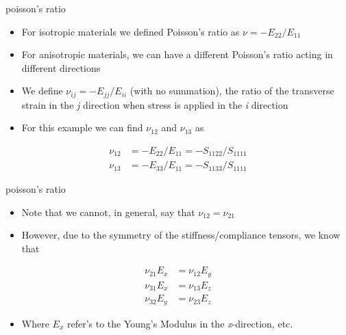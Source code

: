 \documentclass[
  letterpaper,
  ignorenonframetext,
  aspectratio=43,
  handout,
  12pt]{beamer}
\providecommand{\tightlist}{%
  \setlength{\itemsep}{0pt}\setlength{\parskip}{0pt}}
\providecommand{\tightlist}{%
\setlength{\itemsep}{0pt}\setlength{\parskip}{0pt}}
\begin{document}
\begin{frame}{poisson's ratio}
\protect\hypertarget{poissons-ratio}{}
\begin{itemize}
\tightlist
\item
  For isotropic materials we defined Poisson's ratio as
  \(\nu = -E_{22}/E_{11}\)
\item
  For anisotropic materials, we can have a different Poisson's ratio
  acting in different directions
\item
  We define \(\nu_{ij} = -E_{jj}/E_{ii}\) (with no summation), the ratio
  of the transverse strain in the \emph{j} direction when stress is
  applied in the \emph{i} direction
\item
  For this example we can find \(\nu_{12}\) and \(\nu_{13}\) as
\end{itemize}

\[\begin{aligned}
  \nu_{12} &= -E_{22}/E_{11} = -S_{1122}/S_{1111}\\
  \nu_{13} &= -E_{33}/E_{11} = -S_{1133}/S_{1111}
\end{aligned}\]
\end{frame}

\begin{frame}{poisson's ratio}
\protect\hypertarget{poissons-ratio-1}{}
\begin{itemize}
\tightlist
\item
  Note that we cannot, in general, say that \(\nu_{12} = \nu_{21}\)
\item
  However, due to the symmetry of the stiffness/compliance tensors, we
  know that
\end{itemize}

\[\begin{aligned}
  \nu_{21} E_{x} &= \nu_{12} E_{y}\\
  \nu_{31} E_{x} &= \nu_{13} E_{z}\\
  \nu_{32} E_{y} &= \nu_{23} E_{z}
\end{aligned}\]

\begin{itemize}
\tightlist
\item
  Where \(E_x\) refer's to the Young's Modulus in the
  \emph{x}-direction, etc.
\end{itemize}
\end{frame}
\end{document}
